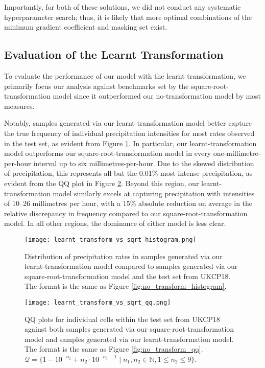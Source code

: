 \documentclass[ oneside,%
                    author={George Herbert},
                    degree={MSci},
                     title={Video Diffusion Models for Climate Simulations},
                  subtitle={}]{dissertation}
\begin{document}
Importantly, for both of these solutions, we did not conduct any systematic hyperparameter search; thus, it is likely that more optimal combinations of the minimum gradient coefficient and masking set exist.

\subsection{Evaluation of the Learnt Transformation}

To evaluate the performance of our model with the learnt transformation, we primarily focus our analysis against benchmarks set by the square-root-transformation model since it outperformed our no-transformation model by most measures.

Notably, samples generated via our learnt-transformation model better capture the true frequency of individual precipitation intensities for most rates observed in the test set, as evident from Figure \ref{fig:learnt_transform_vs_sqrt_histogram}. In particular, our learnt-transformation model outperforms our square-root-transformation model in every one-millimetre-per-hour interval up to six millimetres-per-hour. Due to the skewed distribution of precipitation, this represents all but the 0.01\% most intense precipitation, as evident from the QQ plot in Figure \ref{fig:learnt_transform_vs_sqrt_qq}. Beyond this region, our learnt-transformation model similarly excels at capturing precipitation with intensities of 10--26 millimetres per hour, with a 15\% absolute reduction on average in the relative discrepancy in frequency compared to our square-root-transformation model. In all other regions, the dominance of either model is less clear.

\begin{figure}[htbp]
      \centering
      \texttt{[image: learnt\_transform\_vs\_sqrt\_histogram.png]}
      \caption{Distribution of precipitation rates in samples generated via our learnt-transformation model compared to samples generated via our square-root-transformation model and the test set from UKCP18. The format is the same as Figure \ref{fig:no_transform_histogram}.}
      \label{fig:learnt_transform_vs_sqrt_histogram}
\end{figure}

\begin{figure}[htbp]
      \centering
      \texttt{[image: learnt\_transform\_vs\_sqrt\_qq.png]}
      \caption{QQ plots for individual cells within the test set from UKCP18 against both samples generated via our square-root-transformation model and samples generated via our learnt-transformation model. The format is the same as Figure \ref{fig:no_transform_qq}. $\mathcal{Q} = \{1 - 10^{-n_1} + n_2 \cdot 10^{-n_1 - 1}\mid n_1,n_2\in \mathbb{N}, 1 \le n_2 \le 9\}$.}
      \label{fig:learnt_transform_vs_sqrt_qq}
\end{figure}
\end{document}

